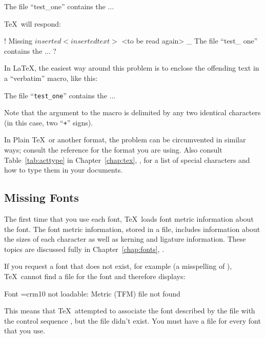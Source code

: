\begin{shortexample}
The file ``test_one'' contains the ...
\end{shortexample}

\TeX\ will respond:

\begin{shortexample}
! Missing $ inserted
<inserted text>
                $
<to be read again>
                  _
The file ``test_
                one'' contains the ...
?
\end{shortexample}

In \LaTeX, the easiest way around this problem is to enclose the offending
text in a ``verbatim'' macro, like this:

\begin{shortexample}
  The file ``\verb+test_one+'' contains the ...
\end{shortexample}

Note that the argument to the  macro is delimited by any two
identical characters (in this case, two ``\verb|+|'' signs).

In Plain \TeX\ or another format, the problem can be circumvented in
similar ways; consult the reference for the format you are using.
Also consult Table~\ref{tab:acttype} in 
Chapter~\ref{chap:tex}, \textit{},
for a list of special characters and how to type them in your documents.

\subsection{Missing Fonts}

The first time that 
you use each font, \TeX\ loads font metric
information about the font.  The font metric information, stored in a
 file, includes information about the sizes of each character
as well as kerning and ligature information.  These topics are
discussed fully in Chapter~\ref{chap:fonts}, {\it{}}.

If you request a font that does not exist, for example
 (a misspelling of ), 
\TeX\ cannot find a  file for the font and
therefore displays:

\begin{shortexample}
Font \myfont=crm10 not loadable: Metric (TFM) file not found
\end{shortexample}

This means that \TeX\ attempted to associate the font described by the
 file  with the control sequence
, but the  file didn't exist.  You
must have a  file for every font that you use.

